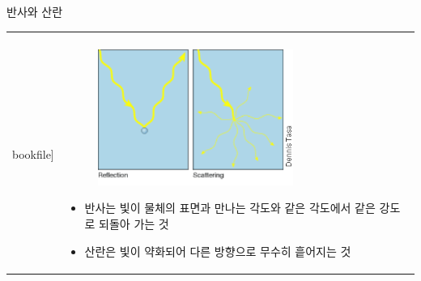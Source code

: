 \begin{frame}[t]{반사와 산란}
	\begin{tabular}{ll}
		\begin{minipage}[t]{.45\textwidth}
			\begin{figure}{}
				\texttt{[image: \\bookfile]} 
			\end{figure}
		\end{minipage}
		&
		\begin{minipage}[t]{.50\textwidth}	
			\begin{figure}{}
				\includegraphics[width=0.7\textwidth]{./images/XxRaPyyhQGGJWvGpPhUk_Module7-012}
			\end{figure}
			\begin{itemize}\scriptsize
				\item 반사는 빛이 물체의 표면과 만나는 각도와 같은 각도에서 같은 강도로 되돌아 가는 것
				\item 산란은 빛이 약화되어 다른 방향으로 무수히 흩어지는 것
			\end{itemize}	
		\end{minipage}
	\end{tabular}
\end{frame}







